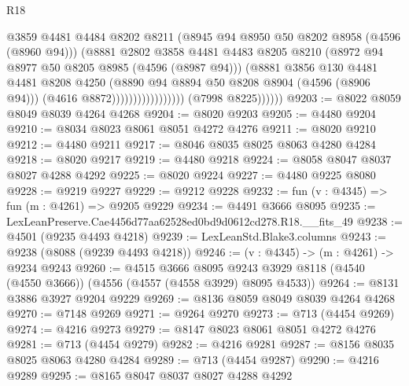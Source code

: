 \begin{lexlean}{R18}
\begin{coremodule}
                                          @3859
                                          @4481
                                          @4484
                                          @8202
                                          @8211
                                          (@8945 @94 @8950 @50 @8202 @8958 (@4596 (@8960 @94)))
                                          (@8881
                                            @2802
                                            @3858
                                            @4481
                                            @4483
                                            @8205
                                            @8210
                                            (@8972 @94 @8977 @50 @8205 @8985 (@4596 (@8987 @94)))
                                            (@8881
                                              @3856
                                              @130
                                              @4481
                                              @4481
                                              @8208
                                              @4250
                                              (@8890 @94 @8894 @50 @8208 @8904 (@4596 (@8906 @94)))
                                              (@4616 @8872)))))))))))))))))
              (@7998 @8225))))))
@9203 := @8022 @8059 @8049 @8039 @4264 @4268
@9204 := @8020 @9203
@9205 := @4480 @9204
@9210 := @8034 @8023 @8061 @8051 @4272 @4276
@9211 := @8020 @9210
@9212 := @4480 @9211
@9217 := @8046 @8035 @8025 @8063 @4280 @4284
@9218 := @8020 @9217
@9219 := @4480 @9218
@9224 := @8058 @8047 @8037 @8027 @4288 @4292
@9225 := @8020 @9224
@9227 := @4480 @9225 @8080
@9228 := @9219 @9227
@9229 := @9212 @9228
@9232 := fun (v : @4345) => fun (m : @4261) => @9205 @9229
@9234 := @4491 @3666 @8095
@9235 := LexLeanPreserve.Cae4456d77aa62528ed0bd9d0612cd278.R18.__fits_49
@9238 := @4501 (@9235 @4493 @4218)
@9239 := LexLeanStd.Blake3.columns
@9243 := @9238 (@8088 (@9239 @4493 @4218))
@9246 := (v : @4345) -> (m : @4261) -> @9234 @9243
@9260 := @4515
    @3666
    @8095
    @9243
    @3929
    @8118
    (@4540 (@4550 @3666))
    (@4556 (@4557 (@4558 @3929) @8095 @4533))
@9264 := @8131 @3886 @3927 @9204 @9229
@9269 := @8136 @8059 @8049 @8039 @4264 @4268
@9270 := @7148 @9269
@9271 := @9264 @9270
@9273 := @713 (@4454 @9269)
@9274 := @4216 @9273
@9279 := @8147 @8023 @8061 @8051 @4272 @4276
@9281 := @713 (@4454 @9279)
@9282 := @4216 @9281
@9287 := @8156 @8035 @8025 @8063 @4280 @4284
@9289 := @713 (@4454 @9287)
@9290 := @4216 @9289
@9295 := @8165 @8047 @8037 @8027 @4288 @4292

\end{coremodule}
\end{lexlean}
